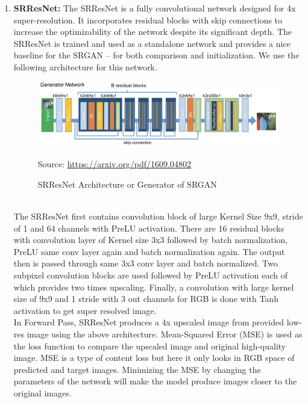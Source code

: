 \begin{enumerate}[label=(\roman*)]
    \item {\bf SRResNet:} The SRResNet is a fully convolutional network designed for 4x super-resolution. It incorporates residual blocks with skip connections to increase the optimizability of the network despite its significant depth. The SRResNet is trained and used as a standalone network and provides a nice baseline for the SRGAN – for both comparison and initialization. We use the following architecture for this network. 
    \begin{figure}[ht]
        \centering
        \includegraphics[width=6in]{./figures/generator.png}
        \caption{SRResNet Architecture or Generator of SRGAN}
        \par  Source: \url{https://arxiv.org/pdf/1609.04802}
    \end{figure} \\
    The SRResNet first contains convolution block of large Kernel Size 9x9, stride of 1 and 64 channels with PreLU activation. There are 16 residual blocks with convolution layer of Kernel size 3x3 followed by batch normalization, PreLU same conv layer again and batch normalization again. The output then is passed through same 3x3 conv layer and batch normalized. Two subpixel convolution blocks are used followed by PreLU activation each of which provides two times upscaling. Finally, a convolution with large kernel size of 9x9 and 1 stride with 3 out channels for RGB is done with Tanh activation to get super resolved image.\\ In Forward Pass, SRResNet produces a 4x upscaled image from provided low-res image using the above architecture. Mean-Squared Error (MSE) is used as the loss function to compare the upscaled image and original high-quality image. MSE is a type of content loss but here it only looks in RGB space of predicted and target images. Minimizing the MSE by changing the parameters of the network will make the model produce images closer to the original images.
    

\end{enumerate}
